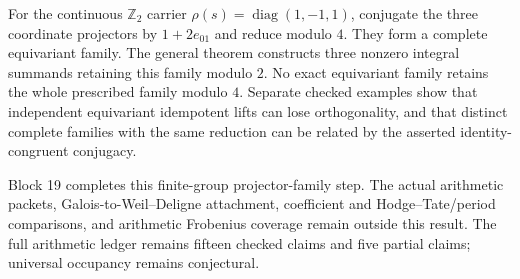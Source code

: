 \documentclass[11pt]{article}
\theoremstyle{definition}
\theoremstyle{remark}
\begin{document}
For the continuous $\mathbb Z_2$ carrier
$\rho(s)=\operatorname{diag}(1,-1,1)$, conjugate the three coordinate
projectors by $1+2e_{01}$ and reduce modulo $4$. They form a complete
equivariant family. The general theorem constructs three nonzero integral
summands retaining this family modulo $2$. No exact equivariant family
retains the whole prescribed family modulo $4$. Separate checked examples
show that independent equivariant idempotent lifts can lose orthogonality,
and that distinct complete families with the same reduction can be related
by the asserted identity-congruent conjugacy.

Block 19 completes this finite-group projector-family step. The actual
arithmetic packets, Galois-to-Weil--Deligne attachment, coefficient and
Hodge--Tate/period comparisons, and arithmetic Frobenius coverage remain
outside this result. The full arithmetic ledger remains fifteen checked
claims and five partial claims; universal occupancy remains conjectural.
\end{document}
